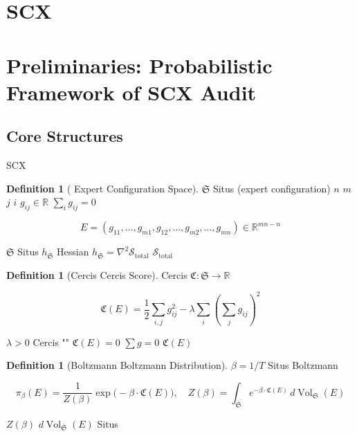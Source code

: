\documentclass[12pt,a4paper]{article}
\theoremstyle{plain}
\theoremstyle{definition}
\newtheorem{definition}[theorem]{ Definition}
\newcommand{\R}{\mathbb{R}}
\newcommand{\Situs}{\mathfrak{S}}
\newcommand{\Cercis}{\mathfrak{C}}
\DeclareMathOperator{\Vol}{Vol}
\begin{document}
\section{SCX }
\section*{Preliminaries: Probabilistic Framework of SCX Audit}

\subsection{ Core Structures}

SCX 

\begin{definition}[ Expert Configuration Space]
 $\Situs$  Situs  (expert configuration) 
 $n$  $m$  $j$  $i$ 
$g_{ij} \in \R$ $\sum_i g_{ij} = 0$

\begin{equation}\label{eq:config}
    E = (g_{11}, \ldots, g_{m1}, g_{12}, \ldots, g_{m2}, \ldots, g_{mn}) \in \R^{mn-n}
\end{equation}

$\Situs$  Situs  $h_{\Situs}$ Hessian 
$h_{\Situs} = \nabla^2 \mathcal{S}_{\text{total}}$
$\mathcal{S}_{\text{total}}$ 
\end{definition}

\begin{definition}[Cercis  Cercis Score]
Cercis  $\Cercis: \Situs \to \R$ 

\begin{equation}\label{eq:cercis}
    \Cercis(E) = \frac{1}{2} \sum_{i,j} g_{ij}^2 - \lambda \sum_{i} \left( \sum_{j} g_{ij} \right)^2
\end{equation}

 $\lambda > 0$ Cercis ""
$\Cercis(E) = 0$  $\sum g = 0$ $\Cercis(E)$ 

\end{definition}

\begin{definition}[Boltzmann  Boltzmann Distribution]
 $\beta = 1/T$ Situs  Boltzmann 

\begin{equation}\label{eq:boltzmann}
    \pi_\beta(E) = \frac{1}{Z(\beta)} \exp\!\big(-\beta \cdot \Cercis(E)\big),\quad
    Z(\beta) = \int_{\Situs} e^{-\beta \cdot \Cercis(E)} \, d\Vol_{\Situs}(E)
\end{equation}

 $Z(\beta)$ $d\Vol_{\Situs}(E)$  Situs 
\end{definition}
\end{document}
